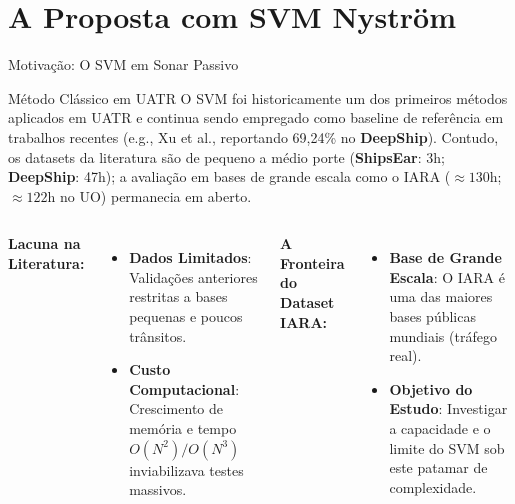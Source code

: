 \documentclass[aspectratio=169]{beamer}
\begin{document}
\section{A Proposta com SVM Nystr\"{o}m}

\begin{frame}{Motiva\c{c}\~{a}o: O SVM em Sonar Passivo}
    \small
    \begin{block}{M\'{e}todo Cl\'{a}ssico em UATR}
        O SVM foi historicamente um dos primeiros m\'{e}todos aplicados em UATR e continua sendo empregado como baseline de refer\^{e}ncia em trabalhos recentes (e.g., Xu et al., reportando 69,24\% no \textbf{DeepShip}). Contudo, os datasets da literatura s\~{a}o de pequeno a m\'{e}dio porte (\textbf{ShipsEar}: 3h; \textbf{DeepShip}: 47h); a avalia\c{c}\~{a}o em bases de grande escala como o IARA ($\approx 130$h; $\approx 122$h no UO) permanecia em aberto.
    \end{block}
    
    \vspace{0.1cm}
    \begin{columns}
        \footnotesize
        \textbf{Lacuna na Literatura:}
        \begin{itemize}
            \item \textbf{Dados Limitados}: Valida\c{c}\~{o}es anteriores restritas a bases pequenas e poucos tr\^{a}nsitos.
            \item \textbf{Custo Computacional}: Crescimento de mem\'{o}ria e tempo $O(N^2)/O(N^3)$ inviabilizava testes massivos.
        \end{itemize}
        
        \footnotesize
        \textbf{A Fronteira do Dataset IARA:}
        \begin{itemize}
            \item \textbf{Base de Grande Escala}: O IARA \'{e} uma das maiores bases p\'{u}blicas mundiais (tr\'{a}fego real).
            \item \textbf{Objetivo do Estudo}: Investigar a capacidade e o limite do SVM sob este patamar de complexidade.
        \end{itemize}
    \end{columns}
\end{frame}
\end{document}
